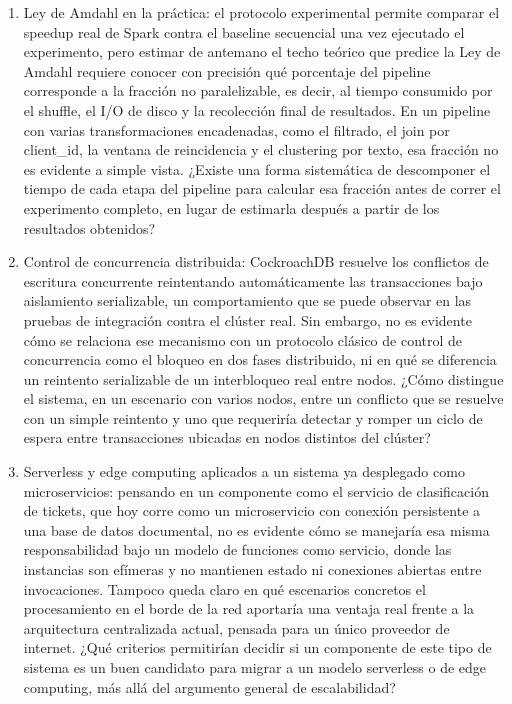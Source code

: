 \documentclass[12pt]{article}
\begin{document}
\begin{enumerate}[leftmargin=*]
  \item Ley de Amdahl en la práctica: el protocolo experimental permite comparar el speedup real de Spark contra el baseline secuencial una vez ejecutado el experimento, pero estimar de antemano el techo teórico que predice la Ley de Amdahl requiere conocer con precisión qué porcentaje del pipeline corresponde a la fracción no paralelizable, es decir, al tiempo consumido por el shuffle, el I/O de disco y la recolección final de resultados. En un pipeline con varias transformaciones encadenadas, como el filtrado, el join por client\_id, la ventana de reincidencia y el clustering por texto, esa fracción no es evidente a simple vista. ¿Existe una forma sistemática de descomponer el tiempo de cada etapa del pipeline para calcular esa fracción antes de correr el experimento completo, en lugar de estimarla después a partir de los resultados obtenidos?

  \item Control de concurrencia distribuida: CockroachDB resuelve los conflictos de escritura concurrente reintentando automáticamente las transacciones bajo aislamiento serializable, un comportamiento que se puede observar en las pruebas de integración contra el clúster real. Sin embargo, no es evidente cómo se relaciona ese mecanismo con un protocolo clásico de control de concurrencia como el bloqueo en dos fases distribuido, ni en qué se diferencia un reintento serializable de un interbloqueo real entre nodos. ¿Cómo distingue el sistema, en un escenario con varios nodos, entre un conflicto que se resuelve con un simple reintento y uno que requeriría detectar y romper un ciclo de espera entre transacciones ubicadas en nodos distintos del clúster?

  \item Serverless y edge computing aplicados a un sistema ya desplegado como microservicios: pensando en un componente como el servicio de clasificación de tickets, que hoy corre como un microservicio con conexión persistente a una base de datos documental, no es evidente cómo se manejaría esa misma responsabilidad bajo un modelo de funciones como servicio, donde las instancias son efímeras y no mantienen estado ni conexiones abiertas entre invocaciones. Tampoco queda claro en qué escenarios concretos el procesamiento en el borde de la red aportaría una ventaja real frente a la arquitectura centralizada actual, pensada para un único proveedor de internet. ¿Qué criterios permitirían decidir si un componente de este tipo de sistema es un buen candidato para migrar a un modelo serverless o de edge computing, más allá del argumento general de escalabilidad?
\end{enumerate}
\end{document}
